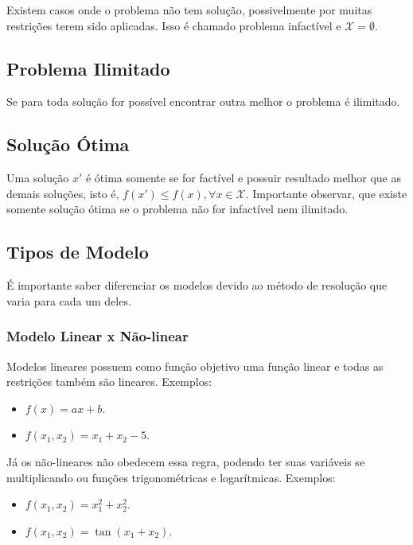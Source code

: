 Existem casos onde o problema não tem solução, possivelmente por muitas restrições terem sido aplicadas.
Isso é chamado problema infactível e $\mathcal{X} = \emptyset$.

\subsection{Problema Ilimitado}\label{subsec:problema-ilimitado}

Se para toda solução for possível encontrar outra melhor o problema é ilimitado.

\subsection{Solução Ótima}\label{subsec:solucao-otima}

Uma solução $x'$ é ótima somente se for factível e possuir resultado melhor que as demais soluções, isto é, $f(x') \le f(x), \forall x \in \mathcal{X}$.
Importante observar, que existe somente solução ótima se o problema não for infactível nem ilimitado.

\subsection{Tipos de Modelo}\label{subsec:tipos-de-modelo}

É importante saber diferenciar os modelos devido ao método de resolução que varia para cada um deles.

\subsubsection{Modelo Linear x Não-linear}\label{subsubsec:modelo-linear}


Modelos lineares possuem como função objetivo uma função linear e todas as restrições também são lineares.
Exemplos:

\begin{itemize}
    \item $f(x) = ax + b$.
    \item $f(x_1, x_2) = x_1 + x_2 - 5$.
\end{itemize}

Já os não-lineares não obedecem essa regra, podendo ter suas variáveis se multiplicando ou funções trigonométricas e logarítmicas.
Exemplos:

\begin{itemize}
    \item $f(x_1, x_2) = x_1^2 + x_2^2$.
    \item $f(x_1, x_2) = \tan(x_1 + x_2)$.
\end{itemize}

